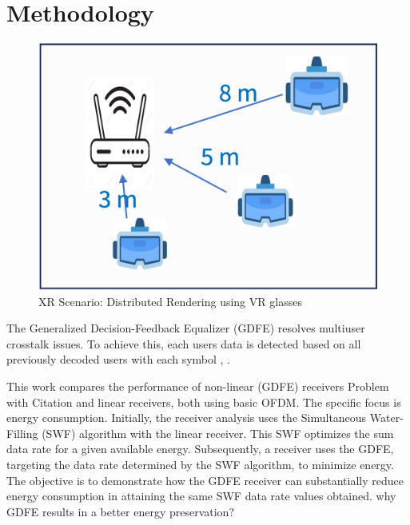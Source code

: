\section{Methodology}
\begin{figure}
    \centering
    \includegraphics{figures/xr.png}
    \caption{XR Scenario: Distributed Rendering using VR glasses}
    \label{fig:xr}
\end{figure}


The Generalized Decision-Feedback Equalizer (GDFE) resolves multiuser crosstalk issues. To achieve this, each users data is detected based on all previously decoded users with each symbol \cite{yu2004sum}, \cite{book}. %

This work compares the performance of non-linear (GDFE) receivers \cite{GDFE} {\color{red} Problem with Citation} and linear receivers\cite{chang1966synthesis}, both using basic OFDM.  The specific focus is energy consumption. Initially, the receiver analysis uses the Simultaneous Water-Filling (SWF) algorithm\cite{book} with the linear receiver.  This SWF optimizes the sum data rate for a given available energy. Subsequently, a receiver uses the GDFE, targeting the data rate determined by the SWF algorithm, to minimize energy. The objective is to demonstrate how the GDFE receiver can substantially reduce energy consumption in attaining the same SWF data rate values obtained. {\color{red} why GDFE results in a better energy preservation?}

